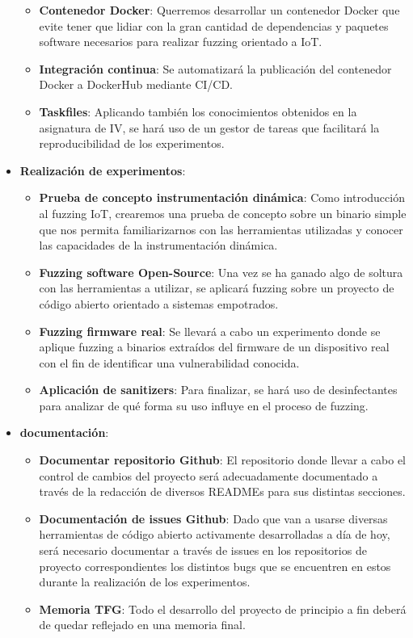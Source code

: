 \begin{itemize}
    \begin{itemize}
        \item \textbf{Contenedor Docker}: Querremos desarrollar un contenedor Docker que evite tener que lidiar con la gran cantidad de dependencias 
        y paquetes software necesarios para realizar fuzzing orientado a IoT.
        \item \textbf{Integración continua}: Se automatizará la publicación del contenedor Docker a DockerHub mediante CI/CD.
        \item \textbf{Taskfiles}: Aplicando también los conocimientos obtenidos en la asignatura de IV, se hará uso de un gestor de tareas que 
        facilitará la reproducibilidad de los experimentos. 
    \end{itemize}
    \item \textbf{Realización de experimentos}:
    \begin{itemize}
        \item \textbf{Prueba de concepto instrumentación dinámica}: Como introducción al fuzzing IoT, crearemos una prueba de concepto sobre
        un binario simple que nos permita familiarizarnos con las herramientas utilizadas y conocer las capacidades de la instrumentación dinámica.
        \item \textbf{Fuzzing software Open-Source}: Una vez se ha ganado algo de soltura con las herramientas a utilizar, se aplicará fuzzing 
        sobre un proyecto de código abierto orientado a sistemas empotrados.
        \item \textbf{Fuzzing firmware real}: Se llevará a cabo un experimento donde se aplique fuzzing a binarios extraídos del firmware de un 
        dispositivo real con el fin de identificar una vulnerabilidad conocida. 
        \item \textbf{Aplicación de sanitizers}: Para finalizar, se hará uso de desinfectantes para analizar de qué forma 
        su uso influye en el proceso de fuzzing.
    \end{itemize}
    \item \textbf{documentación}:
    \begin{itemize}
        \item \textbf{Documentar repositorio Github}: El repositorio donde llevar a cabo el control de cambios del proyecto será 
        adecuadamente documentado a través de la redacción de diversos READMEs para sus distintas secciones.
        \item \textbf{Documentación de issues Github}: Dado que van a usarse diversas herramientas de código abierto activamente 
        desarrolladas a día de hoy, será necesario documentar a través de issues en los repositorios de proyecto correspondientes
        los distintos bugs que se encuentren en estos durante la realización de los experimentos.
        \item \textbf{Memoria TFG}: Todo el desarrollo del proyecto de principio a fin deberá de quedar reflejado en una memoria final.
    \end{itemize}
\end{itemize}

